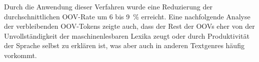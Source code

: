 \documentclass[citeauthoryear]{llncs}
\begin{document}
Durch die Anwendung dieser Verfahren wurde eine Reduzierung der
durchschnittlichen OOV-Rate um 6 bis 9~\% erreicht. Eine nachfolgende
Analyse der verbleibenden OOV-Tokens zeigte auch, dass der Rest der
OOVs eher von der Unvollst\"andigkeit der maschinenlesbaren Lexika
zeugt oder durch Produktivit\"at der Sprache selbst zu erkl\"aren ist,
was aber auch in anderen Textgenres h\"aufig vorkommt.




\end{document}
